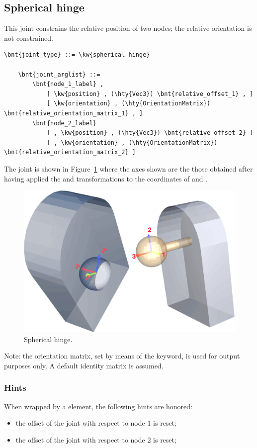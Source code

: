 \subsection{Spherical hinge}
\label{sec:EL:STRUCT:JOINT:SPHERICAL_HINGE}
This joint constrains the relative position of two nodes;
the relative orientation is not constrained.
\begin{Verbatim}[commandchars=\\\{\}]
    \bnt{joint_type} ::= \kw{spherical hinge}

    \bnt{joint_arglist} ::= 
        \bnt{node_1_label} ,
            [ \kw{position} , (\hty{Vec3}) \bnt{relative_offset_1} , ]
            [ \kw{orientation} , (\hty{OrientationMatrix}) \bnt{relative_orientation_matrix_1} , ]
        \bnt{node_2_label}
            [ , \kw{position} , (\hty{Vec3}) \bnt{relative_offset_2} ]
            [ , \kw{orientation} , (\hty{OrientationMatrix}) \bnt{relative_orientation_matrix_2} ]
\end{Verbatim}
The joint is shown in Figure~\ref{fig:el:joint:SPHERE} where the axes shown are the those obtained after having applied the  and  transformations to the coordinates of  and .
\begin{figure}
\centering
\includegraphics[width=.7\textwidth]{spherHinge}
\caption{Spherical hinge.}
\label{fig:el:joint:SPHERE}
\end{figure}
Note: the orientation matrix, set by means of the  keyword,
is used for output purposes only. 
A default identity matrix is assumed.

\subsubsection{Hints}
When wrapped by a  element, the following hints are honored:
\begin{itemize}
\item {} the offset of the joint
with respect to node 1 is reset;
\item {} the offset of the joint
with respect to node 2 is reset;
\end{itemize}

